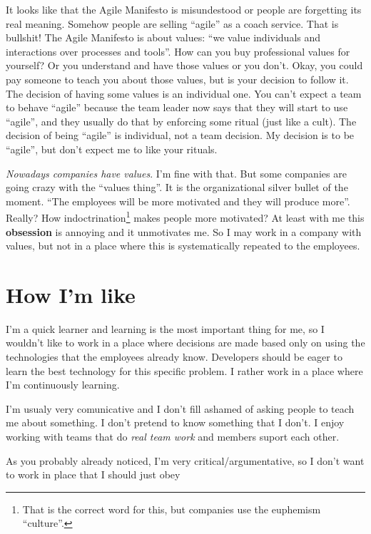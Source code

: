 \documentclass[11pt,a4paper,sans]{moderncv}
\begin{document}
It looks like that the Agile Manifesto is misundestood or people are
forgetting its real meaning. Somehow people are selling ``agile'' as a
coach service. That is bullshit! The Agile Manifesto is about values:
``we value individuals and interactions over processes and tools''.
How can you buy professional values for yourself? Or you understand
and have those values or you don't. Okay, you could pay someone to
teach you about those values, but is your decision to follow it. The
decision of having some values is an individual one. You can't expect
a team to behave ``agile'' because the team leader now says that they
will start to use ``agile'', and they usually do that by enforcing
some ritual (just like a cult).  The decision of being ``agile'' is
individual, not a team decision.  My decision is to be ``agile'', but
don't expect me to like your rituals.

\textit{Nowadays companies have values}. I'm fine with that. But some
companies are going crazy with the ``values thing''. It is the
organizational silver bullet of the moment. ``The employees will be
more motivated and they will produce more''.  Really? How
indoctrination\footnote{That is the correct word for this, but
  companies use the euphemism ``culture''.} makes people more
motivated? At least with me this \textbf{obsession} is annoying and it
unmotivates me.  So I may work in a company with values, but not in a
place where this is systematically repeated to the employees.

\section{How I'm like}
I'm a quick learner and learning is the most important thing for me,
so I wouldn't like to work in a place where decisions are made based
only on using the technologies that the employees already
know. Developers should be eager to learn the best technology for this
specific problem. I rather work in a place where I'm continuously learning.

I'm usualy very comunicative and I don't fill ashamed of asking people
to teach me about something. I don't pretend to know something that I don't.
I enjoy working with teams that do \textit{real team work} and members
suport each other. 

As you probably already noticed, I'm very critical/argumentative, so
I don't want to work in place that I should just obey 
\end{document}
